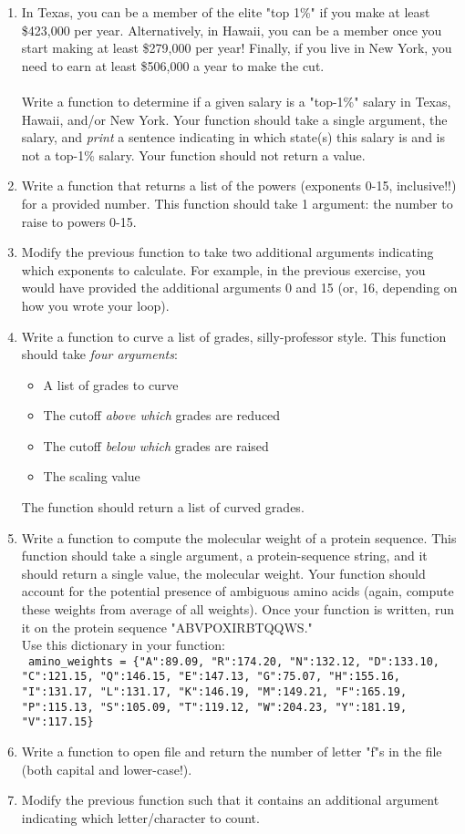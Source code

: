 \documentclass{article}[12pt]
\newcommand{\code}[1]{\texttt{#1}}  %
\begin{document}
\begin{enumerate}

	\item In Texas, you can be a member of the elite "top 1\%" if you make at least \$423,000 per year. Alternatively, in Hawaii, you can be a member once you start making at least \$279,000 per year! Finally, if you live in New York, you need to earn at least \$506,000 a year to make the cut. \\\\ Write a function to determine if a given salary is a "top-1\%" salary in Texas, Hawaii, and/or New York. Your function should take a single argument, the salary, and \emph{print} a sentence indicating in which state(s) this salary is and is not a top-1\% salary. Your function should not return a value.
	
	\item Write a function that returns a list of the powers (exponents 0-15, inclusive!!) for a provided number. This function should take 1 argument: the number to raise to powers 0-15.
	
	\item Modify the previous function to take two additional arguments indicating which exponents to calculate. For example, in the previous exercise, you would have provided the additional arguments 0 and 15 (or, 16, depending on how you wrote your loop). 
	
	\item Write a function to curve a list of grades, silly-professor style. This function should take \emph{four arguments}:
	\begin{itemize}
		\item A list of grades to curve
		\item The cutoff \emph{above which} grades are reduced
		\item The cutoff \emph{below which} grades are raised
		\item The scaling value
	\end{itemize}
	The function should return a list of curved grades. 
	
	\item Write a function to compute the molecular weight of a protein sequence. This function should take a single argument, a protein-sequence string, and it should return a single value, the molecular weight. Your function should account for the potential presence of ambiguous amino acids (again, compute these weights from average of all weights). Once your function is written, run it on the protein sequence "ABVPOXIRBTQQWS." \\ Use this dictionary in your function:
	\\ \code{ amino\_weights = \{"A":89.09, "R":174.20, "N":132.12, "D":133.10, "C":121.15, "Q":146.15, "E":147.13, "G":75.07, "H":155.16, "I":131.17, "L":131.17, "K":146.19, "M":149.21, "F":165.19, "P":115.13, "S":105.09, "T":119.12, "W":204.23, "Y":181.19, "V":117.15\}} 
	
	\item Write a function to open file and return the number of letter "f"\textquotesingle s in the file (both capital and lower-case!). 

	\item Modify the previous function such that it contains an additional argument indicating which letter/character to count.
	
\end{enumerate}
\end{document}
